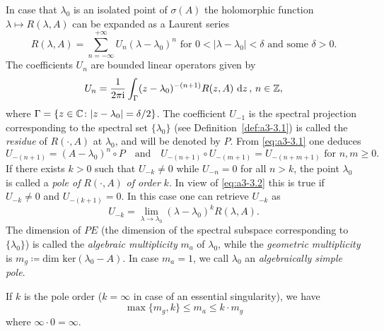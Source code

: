 \begin{example}\label{ex:a3-3.6}

In case that $\lambda_{0}$ is an isolated point of $\sigma(A)$ the holomorphic function $\lambda \mapsto R(\lambda,A)$ can be expanded as a Laurent series
\[
R(\lambda,A) = \sum_{n=-\infty}^{+\infty} U_{n}(\lambda - \lambda_{0})^{n} \text{ for } 0 < |\lambda - \lambda_{0}| < \delta \text{ and some } \delta > 0 .
\]
The coefficients $U_{n}$ are bounded linear operators given by
\begin{equation}\label{eq:a3-3.1}
U_{n} = \frac{1}{2\pi\mathrm{i} }\int_{\Gamma} (z - \lambda_{0})^{-(n+1)}R(z,A) \, \mathop{}\!\mathrm{d}{z} \, , \, n \in \mathbb{Z} ,
\end{equation}
where $\Gamma = \{z \in \mathbb{C} \colon |z - \lambda_{0}| = \delta/2\}$.
The coefficient $U_{-1}$ is the spectral projection corresponding to the spectral set $\{\lambda_{0}\}$ (see Definition~\ref{def:a3-3.1}) is called the \emph{residue} of $R(\cdot,A)$ at $\lambda_{0}$, and will be denoted by $P$.
From \eqref{eq:a3-3.1} one deduces
\begin{equation}\label{eq:a3-3.2}
U_{-(n+1)} = (A - \lambda_{0})^{n} \circ P \quad \text{and} \quad U_{-(n+1)} \circ U_{-(m+1)} = U_{-(n+m+1)} \text{ for } n, m \geq 0 .
\end{equation}
If there exists $k > 0$ such that $U_{-k} \neq 0$ while $U_{-n} = 0$ for all $n > k$, the point $\lambda_{0}$ is called a \emph{pole of} $R(\cdot,A)$ \emph{of order} $k$.
In view of \eqref{eq:a3-3.2} this is true if $U_{-k} \neq 0$ and $U_{-(k+1)} = 0$.
In this case one can retrieve $U_{-k}$ as
\begin{equation}\label{eq:a3-3.3}
U_{-k} = \lim_{\lambda \to \lambda_{0}} (\lambda - \lambda_{0})^{k}R(\lambda,A) .
\end{equation}
The dimension of $PE$ (\ie the dimension of the spectral subspace corresponding to $\{\lambda_{0}\}$) is called the \emph{algebraic multiplicity} $m_{a}$ of $\lambda_{0}$, while the \emph{geometric multiplicity} is $m_{g} \coloneqq \text{dim ker}(\lambda_{0} - A)$.
In case $m_{a} = 1$, we call $\lambda_{0}$ an \emph{algebraically simple pole}.

If $k$ is the pole order ($k = \infty$ in case of an essential singularity), we have
\begin{equation}\label{eq:a3-3.4}
	\max\{m_{g},k\} \leq m_{a} \leq k \cdot m_{g}
\end{equation}
where $\infty \cdot 0 = \infty$.


\end{example}
